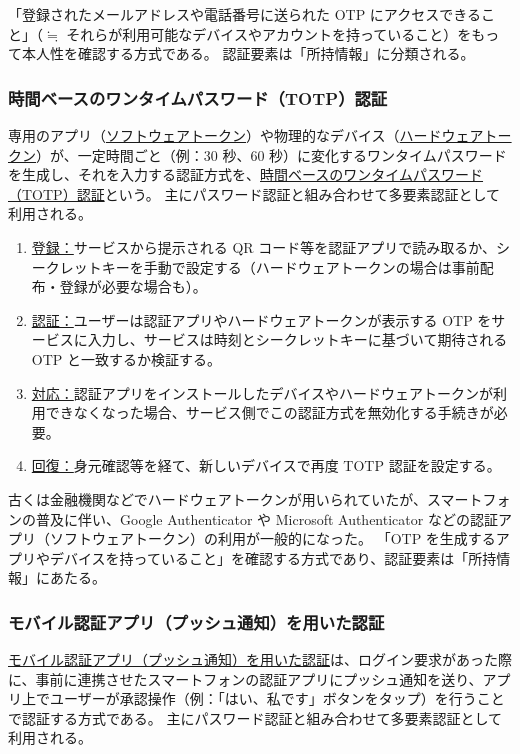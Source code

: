 \documentclass[uplatex]{jsarticle}
\def\label#1{}%
\begin{document}
「登録されたメールアドレスや電話番号に送られた OTP にアクセスできること」（$\fallingdotseq$ それらが利用可能なデバイスやアカウントを持っていること）をもって本人性を確認する方式である。
認証要素は「所持情報」に分類される。

\subsubsection{時間ベースのワンタイムパスワード（TOTP）認証}

\begin{dfn}[TOTP 認証]\label{dfn:totp-auth}
専用のアプリ（\underline{ソフトウェアトークン}）や物理的なデバイス（\underline{ハードウェアトークン}）が、一定時間ごと（例：30 秒、60 秒）に変化するワンタイムパスワードを生成し、それを入力する認証方式を、\underline{時間ベースのワンタイムパスワード（TOTP）認証}という。
主にパスワード認証と組み合わせて多要素認証として利用される。
\end{dfn}

\begin{enumerate}
\item \underline{登録：}サービスから提示される QR コード等を認証アプリで読み取るか、シークレットキーを手動で設定する（ハードウェアトークンの場合は事前配布・登録が必要な場合も）。
\item \underline{認証：}ユーザーは認証アプリやハードウェアトークンが表示する OTP をサービスに入力し、サービスは時刻とシークレットキーに基づいて期待される OTP と一致するか検証する。
\item \underline{対応：}認証アプリをインストールしたデバイスやハードウェアトークンが利用できなくなった場合、サービス側でこの認証方式を無効化する手続きが必要。
\item \underline{回復：}身元確認等を経て、新しいデバイスで再度 TOTP 認証を設定する。
\end{enumerate}

古くは金融機関などでハードウェアトークンが用いられていたが、スマートフォンの普及に伴い、Google Authenticator や Microsoft Authenticator などの認証アプリ（ソフトウェアトークン）の利用が一般的になった。
「OTP を生成するアプリやデバイスを持っていること」を確認する方式であり、認証要素は「所持情報」にあたる。

\subsubsection{モバイル認証アプリ（プッシュ通知）を用いた認証}

\begin{dfn}\label{dfn:push-auth}
\underline{モバイル認証アプリ（プッシュ通知）を用いた認証}は、ログイン要求があった際に、事前に連携させたスマートフォンの認証アプリにプッシュ通知を送り、アプリ上でユーザーが承認操作（例：「はい、私です」ボタンをタップ）を行うことで認証する方式である。
主にパスワード認証と組み合わせて多要素認証として利用される。
\end{dfn}
\end{document}
